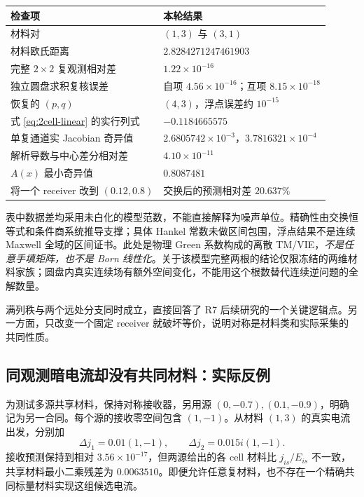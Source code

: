 \begin{longtable}{p{}p{}}
\toprule 检查项 & 本轮结果\\\midrule\endhead
材料对 & $(1,3)$ 与 $(3,1)$\\
材料欧氏距离 & $2.8284271247461903$\\
完整 $2\times2$ 复观测相对差 & $1.22\times10^{-16}$\\
独立圆盘求积复核误差 & 自项 $4.56\times10^{-16}$；互项 $8.15\times10^{-18}$\\
恢复的 $(p,q)$ & $(4,3)$，浮点误差约 $10^{-15}$\\
式 \eqref{eq:2cell-linear} 的实行列式 & $-0.1184665575$\\
单复通道实 Jacobian 奇异值 & $2.6805742\times10^{-3}$，$3.7816321\times10^{-4}$\\
解析导数与中心差分相对差 & $4.10\times10^{-11}$\\
$A(x)$ 最小奇异值 & $0.8087481$\\
将一个 receiver 改到 $(0.12,0.8)$ & 交换后的预测相对差 $20.637\%$\\\bottomrule
\end{longtable}

表中数据差均采用未白化的模型范数，不能直接解释为噪声单位。精确性由交换恒等式和条件商系统推导支撑；具体 Hankel 常数未做区间包围，浮点结果不是连续 Maxwell 全域的区间证书。此处是物理 Green 系数构成的离散 TM/VIE，\emph{不是任意手填矩阵，也不是 Born 线性化}。关于该模型完整两根的结论仅限冻结的两维材料家族；圆盘内真实连续场有额外空间变化，不能用这个根数替代连续逆问题的全解数量。

满列秩与两个远处分支同时成立，直接回答了 R7 后续研究的一个关键逻辑点。另一方面，只改变一个固定 receiver 就破坏等价，说明对称是材料类和实际采集的共同性质。

\subsection{同观测暗电流却没有共同材料：实际反例}

为测试多源共享材料，保持对称接收器，另用源 $(0,-0.7),(0.1,-0.9)$，明确记为另一合同。每个源的接收零空间包含 $(1,-1)$。从材料 $(1,3)$ 的真实电流出发，分别加
\begin{equation}
\Delta j_1=0.01(1,-1),\qquad
\Delta j_2=0.015i(1,-1).
\end{equation}
接收预测保持到相对 $3.56\times10^{-17}$，但两源给出的各 cell 材料比 $j_{is}/E_{is}$ 不一致，共享材料最小二乘残差为 $0.0063510$。即便允许任意复材料，也不存在一个精确共同标量材料实现这组候选电流。

